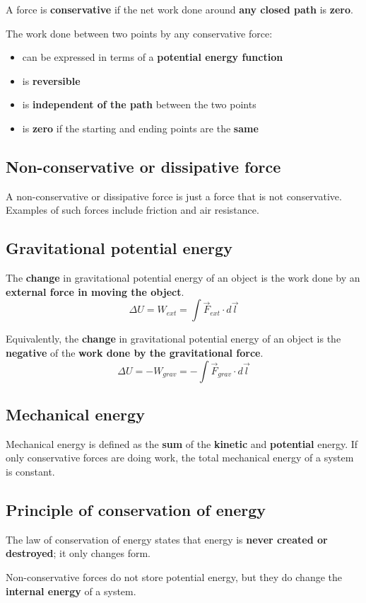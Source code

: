 \documentclass[11pt]{article}
\begin{document}
A force is \textbf{conservative} if the net work done around \textbf{any closed path} is \textbf{zero}.


The work done between two points by any conservative force:
\begin{itemize}
\item can be expressed in terms of a \textbf{potential energy function}
\item is \textbf{reversible}
\item is \textbf{independent of the path} between the two points
\item is \textbf{zero} if the starting and ending points are the \textbf{same}
\end{itemize}
\subsection{Non-conservative or dissipative force}
\label{sec:orgcba07a9}
A non-conservative or dissipative force is just a force that is not conservative. Examples of such forces include friction and air resistance.
\subsection{Gravitational potential energy}
\label{sec:orgdafecbf}
The \textbf{change} in gravitational potential energy of an object is the work done by an \textbf{external force in moving the object}.
\[\Delta U = W_{ext} = \int \vec{F}_{ext} \cdot d \vec{l}\]

Equivalently, the \textbf{change} in gravitational potential energy of an object is the \textbf{negative} of the \textbf{work done by the gravitational force}.
\[\Delta U = -W_{grav} = -\int \vec{F}_{grav} \cdot d \vec{l}\]
\subsection{Mechanical energy}
\label{sec:org7a4906d}
Mechanical energy is defined as the \textbf{sum} of the \textbf{kinetic} and \textbf{potential} energy. If only conservative forces are doing work, the total mechanical energy of a system is constant.
\subsection{Principle of conservation of energy}
\label{sec:org4ed550b}
The law of conservation of energy states that energy is \textbf{never created or destroyed}; it only changes form.


Non-conservative forces do not store potential energy, but they do change the \textbf{internal energy} of a system.
\end{document}
